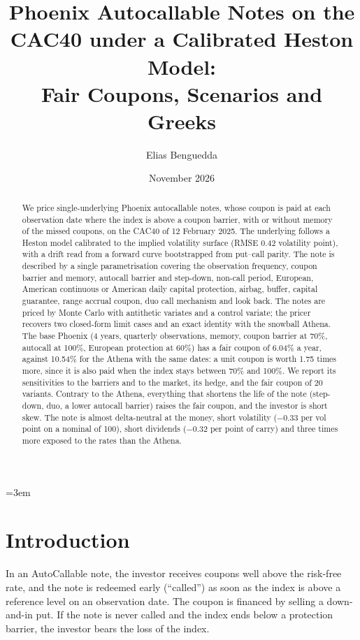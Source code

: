 \documentclass[11pt,a4paper]{article}
\title{Phoenix Autocallable Notes on the CAC40 under a Calibrated Heston Model:\\
Fair Coupons, Scenarios and Greeks}
\author{Elias Benguedda}
\date{November 2026}
\begin{document}
\emergencystretch=3em
\maketitle

\begin{abstract}
We price single-underlying Phoenix autocallable notes, whose coupon is paid at each observation date where the index
is above a coupon barrier, with or without memory of the missed coupons, on the CAC40 of 12 February 2025. The
underlying follows a Heston model calibrated to the implied volatility surface (RMSE 0.42 volatility point), with a
drift read from a forward curve bootstrapped from put--call parity. The note is described by a single
parametrisation covering the observation frequency, coupon barrier and memory, autocall barrier and step-down,
non-call period, European, American continuous or American daily capital protection, airbag, buffer, capital
guarantee, range accrual coupon, duo call mechanism and look back. The notes are priced by Monte Carlo with
antithetic variates and a control variate; the pricer recovers two closed-form limit cases and an exact identity with
the snowball Athena. The base Phoenix (4 years, quarterly observations, memory, coupon barrier at 70\%, autocall at
100\%, European protection at 60\%) has a fair coupon of 6.04\% a year, against 10.54\% for the Athena with the same
dates: a unit coupon is worth 1.75 times more, since it is also paid when the index stays between 70\% and 100\%. We
report its sensitivities to the barriers and to the market, its hedge, and the fair coupon of 20 variants. Contrary
to the Athena, everything that shortens the life of the note (step-down, duo, a lower autocall barrier) raises the
fair coupon, and the investor is short skew. The note is almost delta-neutral at the money, short volatility
($-0.33$ per vol point on a nominal of 100), short dividends ($-0.32$ per point of carry) and three times more
exposed to the rates than the Athena.
\end{abstract}

\clearpage
\tableofcontents
\newpage

\section{Introduction}
In an AutoCallable note, the investor
receives coupons well above the risk-free rate, and the note is redeemed early (``called'') as soon as the index is
above a reference level on an observation date. The coupon is financed by selling a down-and-in put. If the note
is never called and the index ends below a protection barrier, the investor bears the loss of the index.
\end{document}
